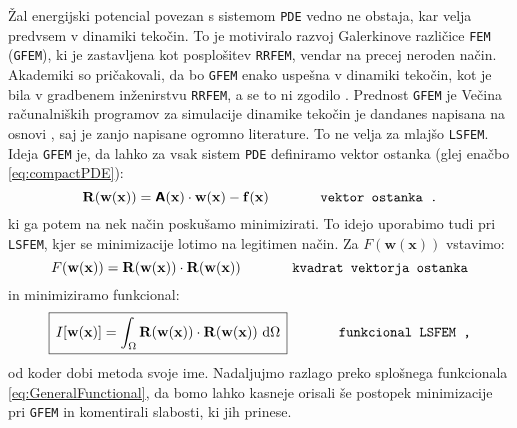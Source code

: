 Žal energijski potencial povezan s sistemom \texttt{PDE} vedno ne obstaja, kar velja predvsem v dinamiki tekočin. To je motiviralo razvoj Galerkinove različice \texttt{FEM} (\texttt{GFEM}), ki je zastavljena kot posplošitev \texttt{RRFEM}, vendar na precej neroden način. Akademiki so pričakovali, da bo \texttt{GFEM} enako uspešna v dinamiki tekočin, kot je bila v gradbenem inženirstvu \texttt{RRFEM}, a se to ni zgodilo \cite{JiangB-LSFEM}. Prednost \texttt{GFEM} je Večina računalniških programov za simulacije dinamike tekočin je dandanes napisana na osnovi , saj je zanjo napisane ogromno literature. To ne velja za mlajšo \texttt{LSFEM}. Ideja \texttt{GFEM} je, da lahko za vsak sistem \texttt{PDE} definiramo vektor ostanka (glej enačbo \eqref{eq:compactPDE}):
\begin{equation}
	\mathbf{R(w(x))} = \bm{\mathsf{A}}(\mathbf{x}) \cdot \mathbf{w(x)} - \mathbf{f(x)} \hspace{1.3cm} \texttt{vektor ostanka .}
	\label{eq:residual}
\end{equation}
ki ga potem na nek način poskušamo minimizirati. To idejo uporabimo tudi pri \texttt{LSFEM}, kjer se minimizacije lotimo na legitimen način. Za $F(\mathbf{w(x)})$ vstavimo:
\begin{equation}
	F(\mathbf{w(x)}) = \mathbf{R(w(x))} \cdot \mathbf{R(w(x))} \hspace{1.3cm} \texttt{kvadrat vektorja ostanka}
\end{equation}
in minimiziramo funkcional:
\begin{equation}
	\boxed{\, I[\mathbf{w(x)}] = \int_{\Omega} \mathbf{R(w(x))} \cdot \mathbf{R(w(x))} \ \mathrm{d} \Omega \,} \hspace{1.3cm} \texttt{funkcional LSFEM ,}
\end{equation}
od koder dobi metoda svoje ime. Nadaljuj\-mo razlago preko splošnega funkcionala \eqref{eq:GeneralFunctional}, da bomo lahko kasneje orisali še postopek minimizacije pri \texttt{GFEM} in komentirali slabosti, ki jih prinese.

